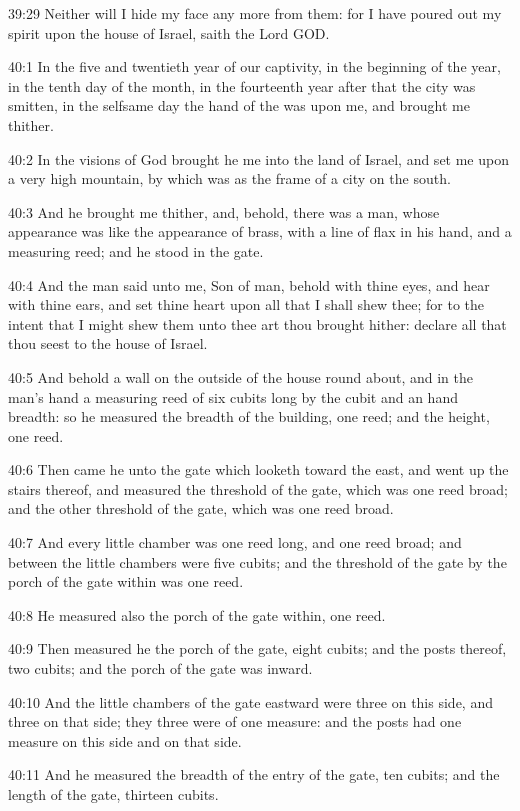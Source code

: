 39:29 Neither will I hide my face any more from them: for I have poured out my spirit upon the house of Israel, saith the Lord GOD.

40:1 In the five and twentieth year of our captivity, in the beginning of the year, in the tenth day of the month, in the fourteenth year after that the city was smitten, in the selfsame day the hand of the \LORD was upon me, and brought me thither.

40:2 In the visions of God brought he me into the land of Israel, and set me upon a very high mountain, by which was as the frame of a city on the south.

40:3 And he brought me thither, and, behold, there was a man, whose appearance was like the appearance of brass, with a line of flax in his hand, and a measuring reed; and he stood in the gate.

40:4 And the man said unto me, Son of man, behold with thine eyes, and hear with thine ears, and set thine heart upon all that I shall shew thee; for to the intent that I might shew them unto thee art thou brought hither: declare all that thou seest to the house of Israel.

40:5 And behold a wall on the outside of the house round about, and in the man's hand a measuring reed of six cubits long by the cubit and an hand breadth: so he measured the breadth of the building, one reed; and the height, one reed.

40:6 Then came he unto the gate which looketh toward the east, and went up the stairs thereof, and measured the threshold of the gate, which was one reed broad; and the other threshold of the gate, which was one reed broad.

40:7 And every little chamber was one reed long, and one reed broad; and between the little chambers were five cubits; and the threshold of the gate by the porch of the gate within was one reed.

40:8 He measured also the porch of the gate within, one reed.

40:9 Then measured he the porch of the gate, eight cubits; and the posts thereof, two cubits; and the porch of the gate was inward.

40:10 And the little chambers of the gate eastward were three on this side, and three on that side; they three were of one measure: and the posts had one measure on this side and on that side.

40:11 And he measured the breadth of the entry of the gate, ten cubits; and the length of the gate, thirteen cubits.

